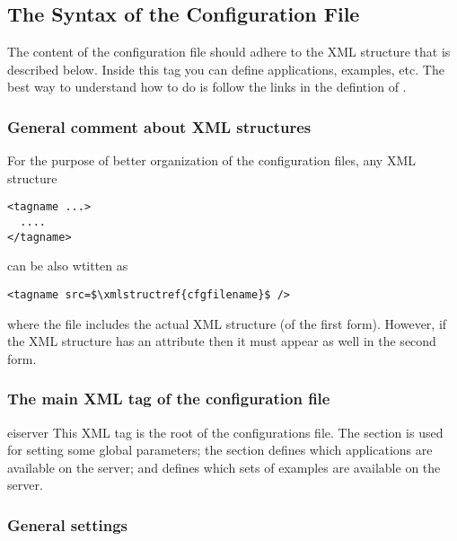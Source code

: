 \subsection{The Syntax of the Configuration File}
\label{ch:server:config:xml}

The content of the configuration file should adhere to the
 XML structure that is described below.
%
Inside this tag you can define applications, examples, etc. The best
way to understand how to do is follow the links in the defintion of
.

\subsubsection*{General comment about XML structures} 

For the purpose of better organization of the configuration files, any
XML structure

\medskip
\begin{lstlisting}
<tagname ...>
  ....
</tagname>
\end{lstlisting}

\medskip
\noindent
can be also wtitten as

\medskip
\begin{lstlisting}
<tagname src=$\xmlstructref{cfgfilename}$ />
\end{lstlisting}

\medskip
\noindent
where the file  includes the actual XML
structure (of the first form). However, if the XML structure has an
attribute  then it must appear as well in the second form.

\subsubsection*{The main XML tag of the configuration file}

\bigskip
\xmlstruct
{eiserver}
{%
This XML tag is the root of the configurations file.
%
The  section is used for setting some global
parameters; the  section defines which applications
are available on the server; and  defines which
sets of examples are available on the server.
%
}
{}%


\subsubsection*{General settings}


